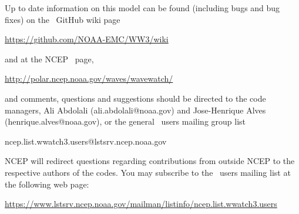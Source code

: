 \vspace{\baselineskip} \noindent 
Up to date information on this model can be found (including bugs and bug
fixes) on the \ws\ GitHub wiki page
\begin{center}
\url{https://github.com/NOAA-EMC/WW3/wiki}
\end{center}
and at the NCEP \ws\ page, 
\begin{center}
\url{http://polar.ncep.noaa.gov/waves/wavewatch/}
\end{center}
and comments, questions and suggestions should be
directed to the code managers, Ali Abdolali (ali.abdolali@noaa.gov) and Jose-Henrique Alves (henrique.alves@noaa.gov), or the general \ws\ users mailing group list

\begin{center}
ncep.list.wwatch3.users@lstsrv.ncep.noaa.gov
\end{center}

\noindent
NCEP will redirect questions regarding contributions from outside NCEP to the
respective authors of the codes. You may subscribe to the \ws\ users 
mailing list at the following web page:
\begin{center}
\footnotesize
\url{https://www.lstsrv.ncep.noaa.gov/mailman/listinfo/ncep.list.wwatch3.users}
\end{center} 

\nocite{tol:OMOD02b}
\nocite{tol:PACO02}
\nocite{tol:GAOS02}
\nocite{tol:OMB02b}
\nocite{tol:OMB02c}
